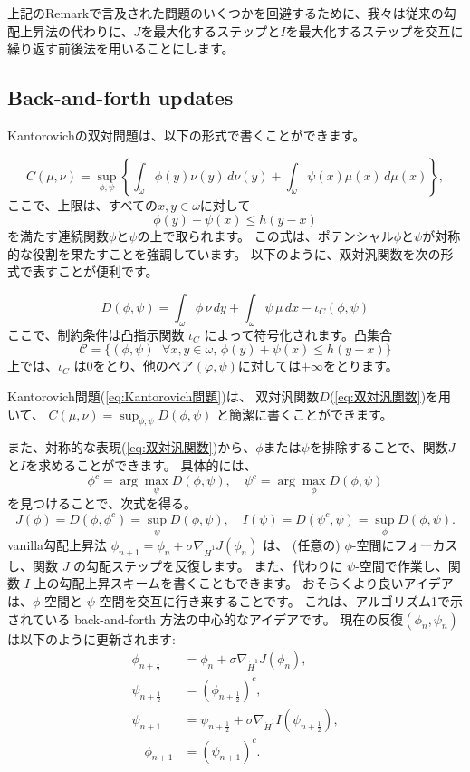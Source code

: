 \documentclass{jsarticle}
\theoremstyle{definition}
\begin{document}
\vspace\baselineskip 

上記のRemarkで言及された問題のいくつかを回避するために、我々は従来の勾配上昇法の代わりに、$J$を最大化するステップと$I$を最大化するステップを交互に繰り返す前後法を用いることにします。



\subsection{Back-and-forth updates}

Kantorovichの双対問題は、以下の形式で書くことができます。

\begin{equation}
  \label{eq:Kantorovich問題}
  C(\mu,\nu)=\sup_{\phi,\psi} \left\{\int_\omega \phi(y) \nu(y) \,d\nu(y)+\int_\omega \psi(x) \mu(x)\,d\mu(x)\right\},
\end{equation}
ここで、上限は、すべての$x,y\in \omega$に対して
$$
\phi(y)+\psi(x)\leq h(y-x)
$$
を満たす連続関数$\phi$と$\psi$の上で取られます。
この式は、ポテンシャル$\phi$と$\psi$が対称的な役割を果たすことを強調しています。
以下のように、双対汎関数を次の形式で表すことが便利です。

\begin{equation}
  \label{eq:双対汎関数}
  D(\phi, \psi) = \int_\omega \phi \,\nu\, dy + \int_\omega \psi \,\mu\, dx - \iota_C(\phi,\psi)
\end{equation}
ここで、制約条件は凸指示関数 $\iota_C$ によって符号化されます。凸集合
$$
\mathcal{C}  = \{(\phi,\psi) \,| \, \forall x,y \in \omega,\, \phi(y) + \psi(x) \leq h(y-x)\}
$$
上では、$\iota_C$ は0をとり、他のペア$(\varphi, \psi)$に対しては$+ \infty$をとります。

\color{teal}
Kantorovich問題(\ref{eq:Kantorovich問題})は、 双対汎関数$D$(\ref{eq:双対汎関数})を用いて、
$C(\mu, \nu) = \sup_{\phi, \psi} D(\phi, \psi)$
と簡潔に書くことができます。

また、対称的な表現(\ref{eq:双対汎関数})から、$\phi$または$\psi$を排除することで、関数$J$と$I$を求めることができます。
具体的には、
$$
\phi^c = \arg\max_\psi D(\phi, \psi), \quad \psi^c = \arg\max_\phi D(\phi, \psi)
$$
を見つけることで、次式を得る。
$$
J(\phi) = D(\phi, \phi^c) = \sup_\psi D(\phi, \psi), \quad I(\psi) = D(\psi^c, \psi) = \sup_\phi D(\phi, \psi).
$$
\color{black}
vanilla勾配上昇法 $\phi_{n+1} = \phi_n + \sigma\nabla_{\dot{H}^1} J(\phi_n)$ は、
(任意の) $\phi$-空間にフォーカスし、関数 $J$ の勾配ステップを反復します。
また、代わりに $\psi$-空間で作業し、関数 $I$ 上の勾配上昇スキームを書くこともできます。
おそらくより良いアイデアは、$\phi$-空間と $\psi$-空間を交互に行き来することです。
これは、アルゴリズム1で示されている back-and-forth 方法の中心的なアイデアです。
現在の反復$(\phi_n, \psi_n)$は以下のように更新されます:
\begin{align*}
  \phi_{n+\frac{1}{2}} &= \phi_n + \sigma \nabla_{\dot{H}^1} J(\phi_n),\\
  \psi_{n+\frac{1}{2}} &= (\phi_{n+\frac{1}{2}})^c,\\
  \psi_{n+1} &= \psi_{n+\frac{1}{2}} + \sigma \nabla_{\dot{H}^1} I(\psi_{n+\frac{1}{2}}), \\
  \quad \phi_{n+1} &= (\psi_{n+1})^c.
\end{align*} 
\end{document}
